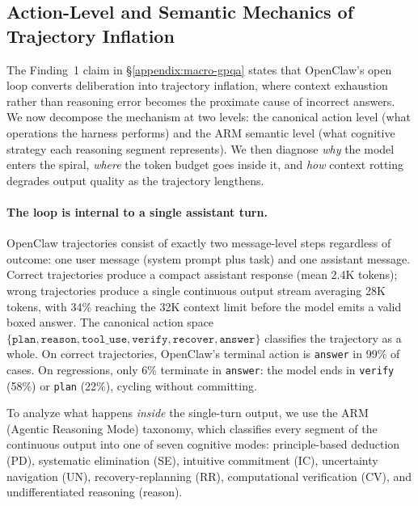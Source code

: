 
\subsection{Action-Level and Semantic Mechanics of Trajectory Inflation}
\label{appendix:macro-gpqa-loop}

The Finding~1 claim in \S\ref{appendix:macro-gpqa} states that OpenClaw's open
loop converts deliberation into trajectory inflation, where context exhaustion
rather than reasoning error becomes the proximate cause of incorrect answers.
We now decompose the mechanism at two levels: the canonical action level (what
operations the harness performs) and the ARM semantic level (what cognitive
strategy each reasoning segment represents).
We then diagnose \emph{why} the model enters the spiral, \emph{where} the token
budget goes inside it, and \emph{how} context rotting degrades output quality
as the trajectory lengthens.

\paragraph{The loop is internal to a single assistant turn.}

OpenClaw trajectories consist of exactly two message-level steps regardless of
outcome: one user message (system prompt plus task) and one assistant message.
Correct trajectories produce a compact assistant response (mean 2.4K tokens);
wrong trajectories produce a single continuous output stream averaging 28K
tokens, with 34\% reaching the 32K context limit before the model emits a valid
boxed answer.
The canonical action space $\{\texttt{plan},\texttt{reason},\texttt{tool\_use},
\texttt{verify},\texttt{recover},\texttt{answer}\}$ classifies the trajectory
as a whole.
On correct trajectories, OpenClaw's terminal action is \texttt{answer} in 99\%
of cases.
On regressions, only 6\% terminate in \texttt{answer}: the model ends in
\texttt{verify} (58\%) or \texttt{plan} (22\%), cycling without committing.

To analyze what happens \emph{inside} the single-turn output, we use the ARM
(Agentic Reasoning Mode) taxonomy, which classifies every segment of the
continuous output into one of seven cognitive modes:
principle-based deduction (PD), systematic elimination (SE), intuitive
commitment (IC), uncertainty navigation (UN), recovery-replanning (RR),
computational verification (CV), and undifferentiated reasoning (reason).

